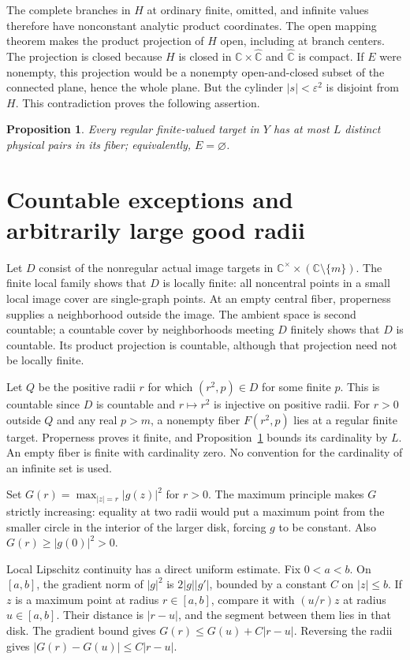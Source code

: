 \documentclass[11pt]{article}
\newtheorem{proposition}[theorem]{Proposition}
\numberwithin{equation}{section}
\newcommand{\C}{\mathbb C}
\newcommand{\Cs}{\C^{\times}}
\newcommand{\Chat}{\widehat{\C}}
\begin{document}
The complete branches in $H$ at ordinary finite, omitted, and infinite
values therefore have nonconstant analytic product coordinates.
The open mapping theorem makes the product projection of $H$ open,
including at branch centers. The projection is closed because $H$ is
closed in $\C\times\Chat$ and $\Chat$ is compact.
If $E$ were nonempty, this projection would be a nonempty open-and-closed
subset of the connected plane, hence the whole plane.
But the cylinder $|s|<\varepsilon^2$ is disjoint from $H$.
This contradiction proves the following assertion.

\begin{proposition}\label{prop:empty}
Every regular finite-valued target in $Y$ has at most $L$ distinct
physical pairs in its fiber; equivalently, $E=\varnothing$.
\end{proposition}

\section{Countable exceptions and arbitrarily large good radii}
\label{sec:radii}

Let $D$ consist of the nonregular actual image targets in
$\Cs\times(\C\setminus\{m\})$. The finite local family shows that $D$ is
locally finite: all noncentral points in a small local image cover are
single-graph points. At an empty central fiber, properness supplies a
neighborhood outside the image. The ambient space is second countable;
a countable cover by neighborhoods meeting $D$ finitely shows that $D$
is countable. Its product projection is countable, although that projection
need not be locally finite.

Let $Q$ be the positive radii $r$ for which $(r^2,p)\in D$ for some finite
$p$. This is countable since $D$ is countable and $r\mapsto r^2$ is
injective on positive radii. For $r>0$ outside $Q$ and any real $p>m$,
a nonempty fiber $F(r^2,p)$ lies at a regular finite target.
Properness proves it finite, and Proposition~\ref{prop:empty} bounds
its cardinality by $L$. An empty fiber is finite with cardinality zero.
No convention for the cardinality of an infinite set is used.

Set $G(r)=\max_{|z|=r}|g(z)|^2$ for $r>0$.
The maximum principle makes $G$ strictly increasing: equality at two
radii would put a maximum point from the smaller circle in the interior
of the larger disk, forcing $g$ to be constant.
Also $G(r)\ge |g(0)|^2>0$.

Local Lipschitz continuity has a direct uniform estimate.
Fix $0<a<b$. On $[a,b]$, the gradient norm of $|g|^2$ is
$2|g||g'|$, bounded by a constant $C$ on $|z|\le b$.
If $z$ is a maximum point at radius $r\in[a,b]$, compare it with
$(u/r)z$ at radius $u\in[a,b]$. Their distance is $|r-u|$, and the segment
between them lies in that disk. The gradient bound gives
$G(r)\le G(u)+C|r-u|$. Reversing the radii gives
$|G(r)-G(u)|\le C|r-u|$.
\end{document}
